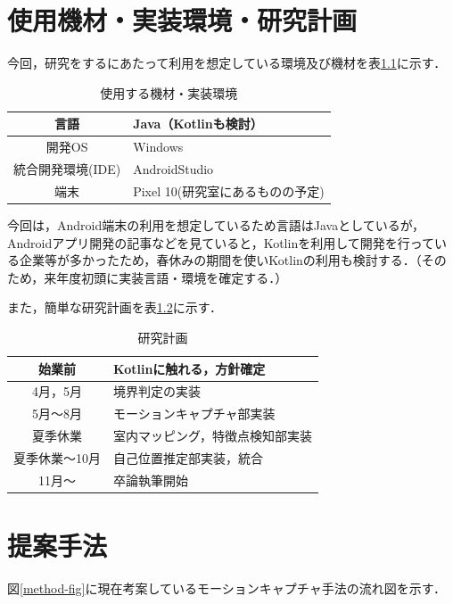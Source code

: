 \documentclass[11pt]{jreport}
\begin{document}
\chapter{使用機材・実装環境・研究計画}
今回，研究をするにあたって利用を想定している環境及び機材を表\ref{jikkoukannkyou}に示す．

\begin{center}
\begin{table}[H]
\caption{使用する機材・実装環境}
\label{jikkoukannkyou}
\center
\begin{tabular}{|c||l|} \hline
言語 & Java（Kotlinも検討） \\ \hline 
開発OS & Windows  \\ \hline
統合開発環境(IDE) & AndroidStudio \\ \hline
端末 & Pixel 10(研究室にあるものの予定) \\ \hline
\end{tabular}
\end{table}
\end{center}

今回は，Android端末の利用を想定しているため言語はJavaとしているが，Androidアプリ開発の記事などを見ていると，Kotlinを利用して開発を行っている企業等が多かったため，春休みの期間を使いKotlinの利用も検討する．（そのため，来年度初頭に実装言語・環境を確定する．）

また，簡単な研究計画を表\ref{keikaku}に示す．

\begin{center}
\begin{table}[H]
\caption{研究計画}
\label{keikaku}
\center
\begin{tabular}{|c||l|} \hline
始業前 & Kotlinに触れる，方針確定 \\ \hline 
4月，5月 & 境界判定の実装  \\ \hline
5月～8月 & モーションキャプチャ部実装 \\ \hline
夏季休業 & 室内マッピング，特徴点検知部実装 \\ \hline
夏季休業～10月 & 自己位置推定部実装，統合 \\ \hline
11月～ & 卒論執筆開始 \\ \hline
\end{tabular}
\end{table}
\end{center}

\chapter{提案手法}\label{chap:fig-tab-exp}
図\ref{method-fig}に現在考案しているモーションキャプチャ手法の流れ図を示す．
\end{document}
